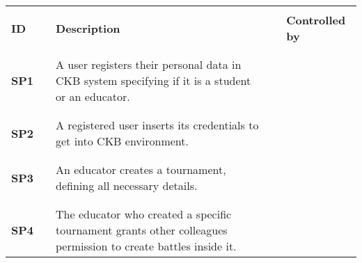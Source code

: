 \renewcommand{\arraystretch}{0.5}
\begin{longtable}[H]{l l p{8.5cm} l l}
    \hline
                   &        &                                                                                                                                   &        &                        \\
    \textbf{ID}    & \vline & \textbf{Description}                                                                                                              & \vline & \textbf{Controlled by} \\
                   &        &                                                                                                                                   &        &                        \\\hline & & \\
    \textbf{SP1}   & \vline & A user registers their personal data in CKB system specifying if it is a student or an educator.                                  & \vline &                        \\
                   &        &                                                                                                                                   &        &                        \\\hline & & \\
    \textbf{SP2}   & \vline & A registered user inserts its credentials to get into CKB environment.                                                            & \vline &                        \\
                   &        &                                                                                                                                   &        &                        \\\hline & & \\
    \textbf{SP3}   & \vline & An educator creates a tournament, defining all necessary details.                                                                 & \vline &                        \\
                   &        &                                                                                                                                   &        &                        \\\hline & & \\
    \textbf{SP4}   & \vline & The educator who created a specific tournament grants other colleagues permission to create battles inside it.                    & \vline &                        \\

\end{longtable}

